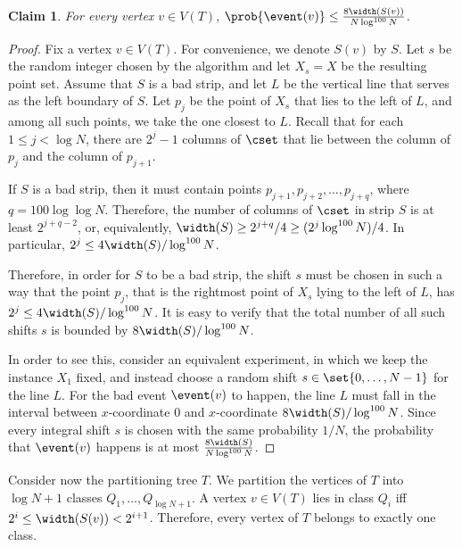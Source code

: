 \documentclass[11pt]{article}
\numberwithin{equation}{section}
\newtheorem{claim}[theorem]{Claim}
\theoremstyle{definition}
\theoremstyle{plain}
\begin{document}
%
	
%
%

\begin{claim}\label{claim: prob bad strip}
For every vertex $v\in V(T)$, $\prob{\event(v)}\leq \frac{8\width(S(v))}{N\log^{100} N}$.
\end{claim}

\begin{proof}
	Fix a vertex $v\in V(T)$.
	For convenience, we denote $S(v)$ by $S$. Let $s$ be the random integer chosen by the algorithm and let $X_s=X$ be the resulting point set.
	Assume that $S$ is a bad strip, and let $L$ be the vertical line that serves as the left boundary of $S$. Let $p_j$ be the point of $X_s$ that lies to the left of $L$, and among all such points, we take the one closest to $L$. Recall that for each $1\leq j< \log N$, there are $2^j-1$ columns of $\cset$ that lie between the column of $p_j$ and the column of $p_{j+1}$. %
	
	If $S$ is a bad strip, then it must contain points $p_{j+1},p_{j+2},\ldots,p_{j+q}$, where $q= 100\log\log N$. Therefore, the number of columns of $\cset$ in strip $S$ is at least $2^{j+q-2}$, or, equivalently, $\width(S)\geq 2^{j+q}/4\geq (2^j\log^{100}N)/4$. In particular, $2^j\leq 4\width(S)/\log^{100}N$. 
	
	Therefore, in order for $S$ to be a bad strip, the shift $s$ must be chosen in such a way that the point $p_j$, that is the rightmost point of $X_s$ lying to the left of $L$, has $2^j\leq 4\width(S)/\log^{100}N$. It is easy to verify that the total number of all such shifts $s$ is bounded by $8\width(S)/\log^{100}N$.
	
	In order to see this, consider an equivalent experiment, in which we keep the instance $X_1$ fixed, and instead choose a random shift $s\in \set{0,\ldots,N-1}$ for the line $L$. For the bad event $\event(v)$ to happen, the line $L$ must fall in the interval between $x$-coordinate $0$ and $x$-coordinate $8\width(S)/\log^{100}N$. Since every integral shift $s$ is chosen with the same probability $1/N$, the probability that $\event(v)$ happens is at most $\frac{8\width(S)}{N\log^{100} N}$.
\end{proof}


Consider now the partitioning tree $T$. We partition the vertices of $T$ into $\log N+1$ classes $Q_1,\ldots,Q_{\log N+1}$. A vertex $v\in V(T)$ lies in class $Q_i$ iff $2^i\leq \width(S(v))< 2^{i+1}$. Therefore, every vertex of $T$ belongs to exactly one class.
\end{document}
